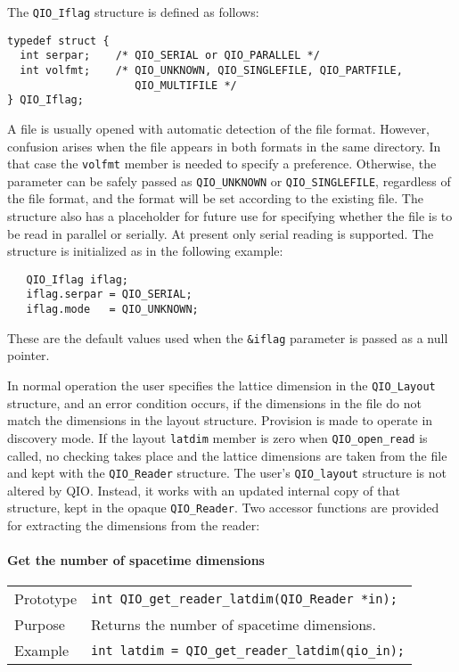 \documentclass{article}
\begin{document}
The \verb|QIO_Iflag| structure is defined as follows:
%
%
\begin{verbatim}
typedef struct {
  int serpar;    /* QIO_SERIAL or QIO_PARALLEL */
  int volfmt;    /* QIO_UNKNOWN, QIO_SINGLEFILE, QIO_PARTFILE, 
                    QIO_MULTIFILE */
} QIO_Iflag;
\end{verbatim}
%

A file is usually opened with automatic detection of the file format.
However, confusion arises when the file appears in both formats in the
same directory.  In that case the \verb|volfmt| member is needed to
specify a preference.  Otherwise, the parameter can be safely passed
as \verb|QIO_UNKNOWN| or \verb|QIO_SINGLEFILE|, regardless of the file
format, and the format will be set according to the existing file.
The structure also has a placeholder for future use for specifying
whether the file is to be read in parallel or serially.  At present
only serial reading is supported.  The structure is initialized as in
the following example:

%
\begin{verbatim}
   QIO_Iflag iflag;
   iflag.serpar = QIO_SERIAL;
   iflag.mode   = QIO_UNKNOWN;
\end{verbatim}
%
These are the default values used when the \verb|&iflag| parameter is
passed as a null pointer.


In normal operation the user specifies the lattice dimension in the
\verb|QIO_Layout| structure, and an error condition occurs, if the
dimensions in the file do not match the dimensions in the layout
structure.  Provision is made to operate in discovery mode.  If the
layout \verb|latdim| member is zero when \verb|QIO_open_read| is
called, no checking takes place and the lattice dimensions are taken
from the file and kept with the \verb|QIO_Reader| structure.  The
user's \verb|QIO_layout| structure is not altered by QIO\@.  Instead,
it works with an updated internal copy of that structure, kept in the
opaque \verb|QIO_Reader|.  Two accessor functions are provided for
extracting the dimensions from the reader:

\paragraph{Get the number of spacetime dimensions}

\begin{flushleft}
  \begin{tabular}{|l|l|}
  \hline
  Prototype      & \verb|int QIO_get_reader_latdim(QIO_Reader *in);| \\
  Purpose        & Returns the number of spacetime dimensions. \\
\hline
  Example  & \verb|int latdim = QIO_get_reader_latdim(qio_in);|\\
   \hline
 \end{tabular}
\end{flushleft}
%
\end{document}
